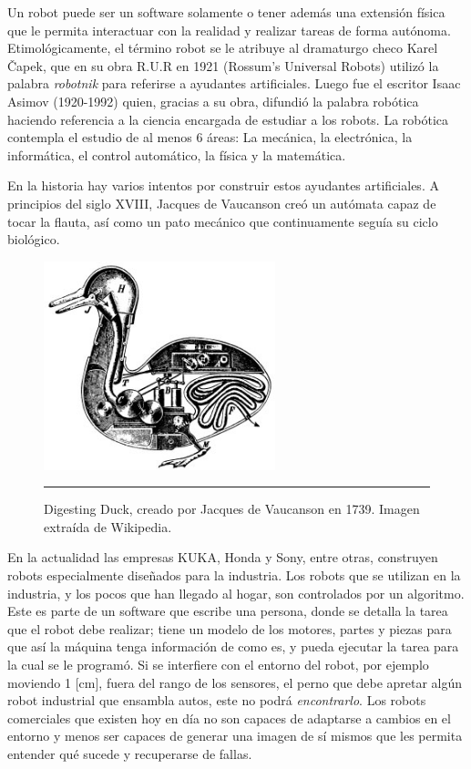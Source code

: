 Un robot puede ser un software solamente o tener además una extensión física que le permita interactuar con la realidad y realizar tareas de forma autónoma. Etimológicamente, el término robot se le atribuye al dramaturgo checo Karel Čapek, que en su obra R.U.R en 1921 (Rossum’s Universal Robots) utilizó la palabra \textit{robotnik} para referirse a ayudantes artificiales. Luego fue el escritor Isaac Asimov (1920-1992) quien,  gracias a su obra, difundió la palabra robótica haciendo referencia a la ciencia encargada de estudiar a los robots. La robótica contempla el estudio de al menos 6 áreas: La mecánica, la electrónica, la informática, el control automático, la física y la matemática.

En la historia hay varios intentos por construir estos ayudantes artificiales. A principios del siglo XVIII, Jacques de Vaucanson creó un autómata capaz de tocar la flauta, así como un pato mecánico que continuamente seguía su ciclo biológico.

\begin{figure}[htbp]
	\centering
		\includegraphics[width=0.6\textwidth]{./Figures/Duck_of_Vaucanson.jpg}
		\rule{35em}{0.5pt}
	\caption[Robot Digesting Duck]{Digesting Duck, creado por Jacques de Vaucanson en 1739. Imagen extraída de Wikipedia.}
	\label{fig:Duck}
\end{figure}

En la actualidad las empresas KUKA, Honda y Sony, entre otras, construyen robots especialmente diseñados para la industria. Los robots que se utilizan en la industria, y los pocos que han llegado al hogar, son controlados por un algoritmo. Este es parte de un software que escribe una persona, donde se detalla la tarea que el robot debe realizar; tiene un modelo de los motores, partes y piezas para que así la máquina tenga información de como es, y pueda ejecutar la tarea para la cual se le programó. Si se interfiere con el entorno del robot, por ejemplo moviendo 1 [cm], fuera del rango de los sensores, el perno que debe apretar algún robot industrial que ensambla autos, este no podrá \textit{encontrarlo}. Los robots comerciales que existen hoy en día no son capaces de adaptarse a cambios en el entorno y menos ser capaces de generar una imagen de sí mismos que les permita entender qué sucede y recuperarse de fallas.

